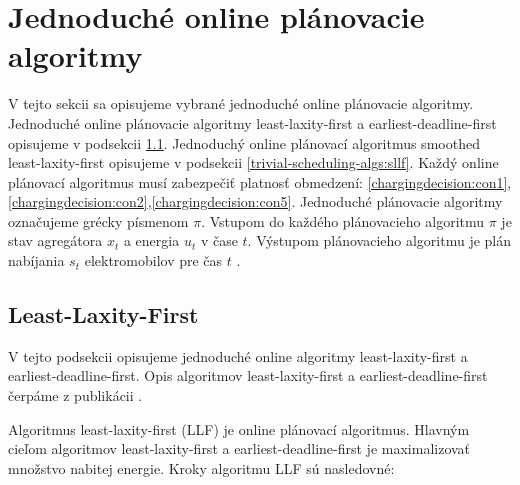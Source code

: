  \section{Jednoduché online plánovacie algoritmy}
 \label{trivial-scheduling-algs}
 V tejto sekcii sa opisujeme vybrané jednoduché online plánovacie algoritmy. Jednoduché online plánovacie algoritmy least-laxity-first a earliest-deadline-first opisujeme v podsekcii \ref{trivial-scheduling-algs:llf-edf}. Jednoduchý online plánovací algoritmus smoothed least-laxity-first opisujeme v podsekcii \ref{trivial-scheduling-algs:sllf}.
 Každý online plánovací algoritmus  musí zabezpečiť platnosť obmedzení: \eqref{chargingdecision:con1},\eqref{chargingdecision:con2},\eqref{chargingdecision:con5}. Jednoduché plánovacie algoritmy označujeme grécky písmenom $\pi$. Vstupom do každého plánovacieho algoritmu $\pi$ je stav agregátora $x_{t}$ a energia $u_{t}$ v čase $t$. Výstupom plánovacieho algoritmu je plán nabíjania $s_{t}$  elektromobilov pre čas $t$ \cite{Li_2021}. 
 
 \subsection{Least-Laxity-First}
 \label{trivial-scheduling-algs:llf-edf}

 V tejto podsekcii opisujeme jednoduché online algoritmy least-laxity-first a earliest-deadline-first.
 Opis algoritmov least-laxity-first a earliest-deadline-first čerpáme z publikácii \cite{lee2021adaptivephd, chen2021smoothed, chen2017smoothed}. 
 



Algoritmus least-laxity-first (LLF) je online plánovací algoritmus. Hlavným cieľom algoritmov least-laxity-first a earliest-deadline-first je maximalizovať množstvo nabitej energie. Kroky algoritmu LLF sú nasledovné:


